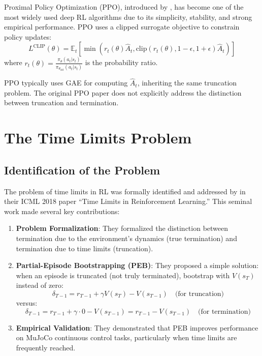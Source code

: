 \documentclass[11pt,a4paper]{article}
\begin{document}
Proximal Policy Optimization (PPO), introduced by \citet{schulman2017proximal}, has become one of the most widely used deep RL algorithms due to its simplicity, stability, and strong empirical performance. PPO uses a clipped surrogate objective to constrain policy updates:
\begin{equation}
    L^{\text{CLIP}}(\theta) = \mathbb{E}_t\left[\min\left(r_t(\theta)\hat{A}_t, \text{clip}(r_t(\theta), 1-\epsilon, 1+\epsilon)\hat{A}_t\right)\right]
\end{equation}
where $r_t(\theta) = \frac{\pi_\theta(a_t|s_t)}{\pi_{\theta_{\text{old}}}(a_t|s_t)}$ is the probability ratio.

PPO typically uses GAE for computing $\hat{A}_t$, inheriting the same truncation problem. The original PPO paper does not explicitly address the distinction between truncation and termination.

\section{The Time Limits Problem}

\subsection{Identification of the Problem}

The problem of time limits in RL was formally identified and addressed by \citet{pardo2018time} in their ICML 2018 paper ``Time Limits in Reinforcement Learning.'' This seminal work made several key contributions:

\begin{enumerate}
    \item \textbf{Problem Formalization}: They formalized the distinction between termination due to the environment's dynamics (true termination) and termination due to time limits (truncation).
    
    \item \textbf{Partial-Episode Bootstrapping (PEB)}: They proposed a simple solution: when an episode is truncated (not truly terminated), bootstrap with $V(s_T)$ instead of zero:
    \begin{equation}
        \delta_{T-1} = r_{T-1} + \gamma V(s_T) - V(s_{T-1}) \quad \text{(for truncation)}
    \end{equation}
    versus:
    \begin{equation}
        \delta_{T-1} = r_{T-1} + \gamma \cdot 0 - V(s_{T-1}) = r_{T-1} - V(s_{T-1}) \quad \text{(for termination)}
    \end{equation}
    
    \item \textbf{Empirical Validation}: They demonstrated that PEB improves performance on MuJoCo continuous control tasks, particularly when time limits are frequently reached.
\end{enumerate}
\end{document}
